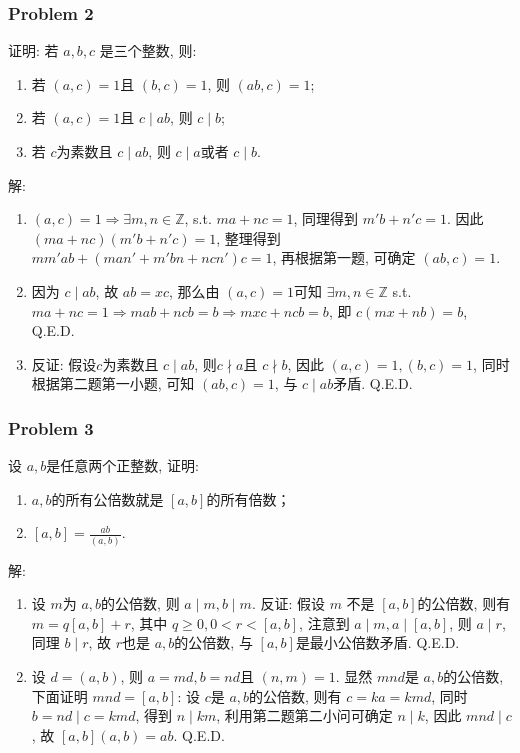 \documentclass[a4paper,12pt]{ctexart}
\begin{document}
\subsubsection*{Problem 2} 
    证明: 若 $ a,b,c $ 是三个整数, 则: 
    \begin{enumerate}[label=(\arabic*)]
        \item 若 $ (a,c)=1 $且 $ (b,c)=1 $, 则 $ (ab,c)=1 $;
        \item 若 $ (a,c)=1 $且 $ c\mid ab $, 则 $ c\mid b $;
        \item 若 $ c $为素数且 $ c\mid ab $, 则 $ c\mid a $或者 $ c\mid b $.
    \end{enumerate}
    解: \begin{enumerate}[label=(\arabic*)]
        \item  $ (a,c)=1\Rightarrow\exists m,n\in\mathbb{Z} $, s.t. $ ma+nc=1 $, 同理得到 $ m'b+n'c=1 $.
        因此 $ (ma+nc)(m'b+n'c)=1 $, 整理得到 $ mm'ab+(man'+m'bn+ncn')c=1 $, 再根据第一题, 可确定 $ (ab,c)=1 $.
        \item 因为 $ c\mid ab $, 故 $ ab=xc $, 那么由 $ (a,c)=1 $可知 $ \exists m,n\in\mathbb{Z} $ s.t. 
        $ ma+nc=1\Rightarrow mab+ncb=b\Rightarrow mxc+ncb=b $, 即 $ c(mx+nb)=b $, Q.E.D.
        \item 反证: 假设$ c $为素数且 $ c\mid ab $, 则$ c\nmid a $且 $ c\nmid b $, 因此 $ (a,c)=1,(b,c)=1 $, 同时根据第二题第一小题, 可知 $ (ab,c)=1 $, 与 $ c\mid ab $矛盾. Q.E.D.
    \end{enumerate}
\subsubsection*{Problem 3}
    设 $ a,b $是任意两个正整数, 证明: 
    \begin{enumerate}[label=(\arabic*)]
        \item $ a,b $的所有公倍数就是 $ [a,b] $的所有倍数；
        \item $ [a,b]=\frac{ab}{(a,b)} $.
    \end{enumerate}
    解:\begin{enumerate}[label=(\arabic*)]
        \item 设 $ m $为 $ a,b $的公倍数, 则 $ a\mid m,b\mid m $. 反证: 假设 $ m $ 不是 $ [a,b] $的公倍数, 则有
        $ m=q[a,b]+r $, 其中 $ q\ge 0,0<r<[a,b] $, 注意到 $ a\mid m,a\mid [a,b] $, 则 $ a\mid r $, 
        同理 $ b\mid r $, 故 $ r $也是 $ a,b $的公倍数, 与 $ [a,b] $是最小公倍数矛盾. Q.E.D.
        \item 设 $ d=(a,b) $, 则 $ a=md,b=nd $且 $ (n,m)=1 $. 显然 $ mnd $是 $ a,b $的公倍数, 
        下面证明 $ mnd=[a,b] $: 设 $ c $是 $ a,b $的公倍数, 则有 $ c=ka=kmd $, 同时 $ b=nd\mid c=kmd $, 得到
        $ n\mid km $, 利用第二题第二小问可确定 $ n\mid k $, 因此 $ mnd\mid c $, 故 $ [a,b](a,b)=ab $. Q.E.D.
    \end{enumerate}
\end{document}
